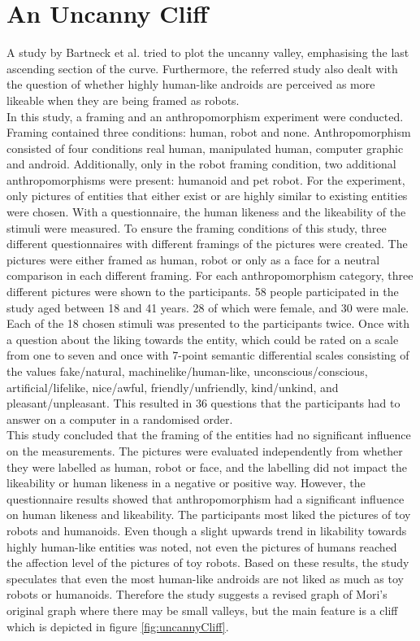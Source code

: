 \section{An Uncanny Cliff}
A study by Bartneck et al. \cite{uncanny_cliff} tried to plot the uncanny valley, emphasising the last ascending section of the curve. Furthermore, the referred study also dealt with the question of whether highly human-like androids are perceived as more likeable when they are being framed as robots.\\
In this study, a framing and an anthropomorphism experiment were conducted. Framing contained three conditions: human, robot and none. Anthropomorphism consisted of four conditions real human, manipulated human, computer graphic and android. Additionally, only in the robot framing condition, two additional anthropomorphisms were present: humanoid and pet robot. For the experiment, only pictures of entities that either exist or are highly similar to existing entities were chosen. 
With a questionnaire, the human likeness and the likeability of the stimuli were measured.
To ensure the framing conditions of this study, three different questionnaires with different framings of the pictures were created. The pictures were either framed as human, robot or only as a face for a neutral comparison in each different framing. For each anthropomorphism category, three different pictures were shown to the participants. 
58 people participated in the study aged between 18 and 41 years. 28 of which were female, and 30 were male.
Each of the 18 chosen stimuli was presented to the participants twice. Once with a question about the liking towards the entity, which could be rated on a scale from one to seven and once with 7-point semantic differential scales consisting of the values fake/natural, machinelike/human-like, unconscious/conscious, artificial/lifelike, nice/awful, friendly/unfriendly, kind/unkind, and pleasant/unpleasant. This resulted in 36 questions that the participants had to answer on a computer in a randomised order.\\
This study concluded that the framing of the entities had no significant influence on the measurements. The pictures were evaluated independently from whether they were labelled as human, robot or face, and the labelling did not impact the likeability or human likeness in a negative or positive way.
 However, the questionnaire results showed that anthropomorphism had a significant influence on human likeness and likeability. The participants most liked the pictures of toy robots and humanoids. Even though a slight upwards trend in likability towards highly human-like entities was noted, not even the pictures of humans reached the affection level of the pictures of toy robots. Based on these results, the study speculates that even the most human-like androids are not liked as much as toy robots or humanoids. Therefore the study suggests a revised graph of Mori's original graph where there may be small valleys, but the main feature is a cliff which is depicted in figure \ref{fig:uncannyCliff}.
